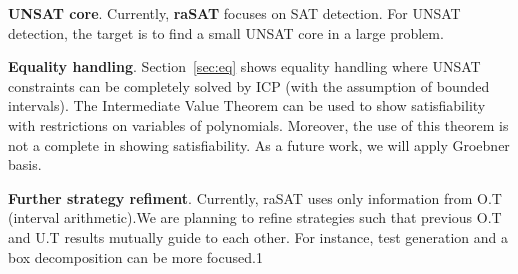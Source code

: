 \documentclass[runningheads,a4paper,oribibl]{llncs}
\begin{document}
\medskip \noindent 
{\bf UNSAT core}. Currently, \textbf{raSAT} focuses on SAT detection. For
UNSAT detection, the target is to find a small UNSAT core in a large problem.


\medskip \noindent 
{\bf Equality handling}. 
Section~\ref{sec:eq} shows equality handling where UNSAT constraints can be completely solved by ICP (with the assumption of bounded intervals). The Intermediate Value Theorem can be used to show satisfiability with restrictions on variables of polynomials. Moreover, the use of this theorem is not a complete in showing satisfiability. As a future work, we will apply Groebner basis.

\medskip \noindent 
{\bf Further strategy refiment}. 
Currently, raSAT uses only information from
O.T (interval arithmetic).We are planning to refine strategies such that previous
O.T and U.T results mutually guide to each other. For instance, test generation
and a box decomposition can be more focused.1
\end{document}
